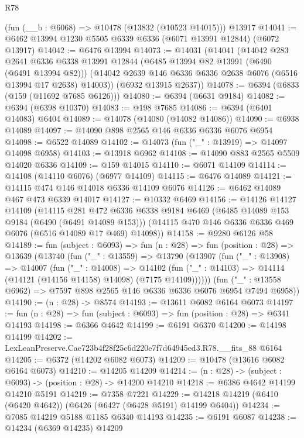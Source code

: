 \begin{lexlean}{R78}
\begin{coremodule}
    (fun (__b : @6068) => @10478 (@13832 (@10523 @14015)))
    @13917
@14041 := @6462 @13994 @1230 @5505 @6339 @6336 (@6071 @13991 @12844) (@6072 @13917)
@14042 := @6476 @13994
@14073 := @14031
    (@14041
      (@14042
        @283
        @2641
        @6336
        @6338
        @13991
        @12844
        (@6485 @13994 @82 @13991 (@6490 (@6491 @13994 @82)))
        (@14042 @2639 @146 @6336 @6336 @2638 @6076 (@6516 @13994 @17 @2638) @14003))
      (@6932 @13915 @2637))
@14078 := @6394 (@6833 (@159 (@11692 @7685 @6126)))
@14080 := @6394 (@6631 @9184)
@14082 := @6394 (@6398 @10370)
@14083 := @198 @7685
@14086 := @6394 (@6401 @14083) @6404
@14089 := @14078 (@14080 (@14082 @14086))
@14090 := @6938 @14089
@14097 := @14090 @898 @2565 @146 @6336 @6336 @6076 @6954
@14098 := @6522 @14089
@14102 := @14073 (fun ("_" : @13919) => @14097 @14098 @6958)
@14103 := @13918 @6962
@14108 := @14090 @883 @2565 @5509 @14020 @6336
@14109 := @159 @14015
@14110 := @6071 @14109
@14114 := @14108 (@14110 @6076) (@6977 @14109)
@14115 := @6476 @14089
@14121 := @14115 @474 @146 @14018 @6336 @14109 @6076
@14126 := @6462 @14089 @467 @473 @6339 @14017
@14127 := @10332 @6469
@14156 := @14126
    @14127
    @14109
    (@14115
      @281
      @472
      @6336
      @6338
      @9184
      @6469
      (@6485 @14089 @153 @9184 (@6490 (@6491 @14089 @153)))
      (@14115 @470 @146 @6336 @6336 @469 @6076 (@6516 @14089 @17 @469) @14098))
@14158 := @9280 @6126 @58
@14189 := fun (subject : @6093) =>
  fun (n : @28) =>
  fun (position : @28) =>
  @13639
    (@13740
      (fun ("_" : @13559) =>
      @13790
        (@13907
          (fun ("_" : @13908) =>
          @14007
            (fun ("_" : @14008) =>
            @14102 (fun ("_" : @14103) => @14114 (@14121 (@14156 @14158) @14098) (@7175 @14109))))))
      (fun ("_" : @13558 @6962) => @7597 @898 @2565 @146 @6336 @6336 @6076 @6954 @7494 @6958))
@14190 := (n : @28) -> @8574
@14193 := @13611 @6082 @6164 @6073
@14197 := fun (n : @28) => fun (subject : @6093) => fun (position : @28) => @6341 @14193
@14198 := @6366 @4642
@14199 := @6191 @6370
@14200 := @14198 @14199
@14202 := LexLeanPreserve.Cae723b4f28f25c6d220e7f7d64945ed3.R78.__fits_88 @6164
@14205 := @6372 (@14202 @6082 @6073)
@14209 := @10478 (@13616 @6082 @6164 @6073)
@14210 := @14205 @14209
@14214 := (n : @28) -> (subject : @6093) -> (position : @28) -> @14200 @14210
@14218 := @6386 @4642 @14199 @14210 @5191
@14219 := @7358 @7221
@14229 := @14218 @14219 (@6410 (@6420 @4642)) (@6426 (@6427 (@6428 @5191) @14199 @6404))
@14234 := @7085 @14219 @5188 @1185 @6340 @14193
@14235 := @6191 @6087
@14238 := @14234 (@6369 @14235) @14209

\end{coremodule}
\end{lexlean}
